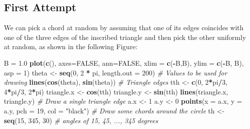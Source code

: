 \documentclass[
]{article}
\newenvironment{Shaded}{\begin{snugshade}}{\end{snugshade}}
\newcommand{\AttributeTok}[1]{\textcolor[rgb]{0.13,0.29,0.53}{#1}}
\newcommand{\CommentTok}[1]{\textcolor[rgb]{0.56,0.35,0.01}{\textit{#1}}}
\newcommand{\ConstantTok}[1]{\textcolor[rgb]{0.56,0.35,0.01}{#1}}
\newcommand{\DecValTok}[1]{\textcolor[rgb]{0.00,0.00,0.81}{#1}}
\newcommand{\FloatTok}[1]{\textcolor[rgb]{0.00,0.00,0.81}{#1}}
\newcommand{\FunctionTok}[1]{\textcolor[rgb]{0.13,0.29,0.53}{\textbf{#1}}}
\newcommand{\NormalTok}[1]{#1}
\newcommand{\OtherTok}[1]{\textcolor[rgb]{0.56,0.35,0.01}{#1}}
\newcommand{\SpecialCharTok}[1]{\textcolor[rgb]{0.81,0.36,0.00}{\textbf{#1}}}
\newcommand{\StringTok}[1]{\textcolor[rgb]{0.31,0.60,0.02}{#1}}
\begin{document}
\subsection{First Attempt}\label{first-attempt}

We can pick a chord at random by assuming that one of its edges
coincides with one of the three edges of the inscribed triangle and then
pick the other uniformly at random, as shown in the following Figure:

\begin{Shaded}
\begin{Highlighting}[]
\NormalTok{B }\OtherTok{=} \FloatTok{1.0}
\FunctionTok{plot}\NormalTok{(}\FunctionTok{c}\NormalTok{(), }\AttributeTok{axes=}\ConstantTok{FALSE}\NormalTok{, }\AttributeTok{ann=}\ConstantTok{FALSE}\NormalTok{, }\AttributeTok{xlim =} \FunctionTok{c}\NormalTok{(}\SpecialCharTok{{-}}\NormalTok{B,B), }\AttributeTok{ylim  =} \FunctionTok{c}\NormalTok{(}\SpecialCharTok{{-}}\NormalTok{B, B), }\AttributeTok{asp =} \DecValTok{1}\NormalTok{)}
\NormalTok{theta }\OtherTok{\textless{}{-}} \FunctionTok{seq}\NormalTok{(}\DecValTok{0}\NormalTok{, }\DecValTok{2} \SpecialCharTok{*}\NormalTok{ pi, }\AttributeTok{length.out =} \DecValTok{200}\NormalTok{) }\CommentTok{\# Values to be used for drawing}
\FunctionTok{lines}\NormalTok{(}\FunctionTok{cos}\NormalTok{(theta), }\FunctionTok{sin}\NormalTok{(theta))}
\CommentTok{\# Triangle edges}
\NormalTok{tth }\OtherTok{\textless{}{-}} \FunctionTok{c}\NormalTok{(}\DecValTok{0}\NormalTok{, }\DecValTok{2}\SpecialCharTok{*}\NormalTok{pi}\SpecialCharTok{/}\DecValTok{3}\NormalTok{, }\DecValTok{4}\SpecialCharTok{*}\NormalTok{pi}\SpecialCharTok{/}\DecValTok{3}\NormalTok{, }\DecValTok{2}\SpecialCharTok{*}\NormalTok{pi)}
\NormalTok{triangle.x }\OtherTok{\textless{}{-}} \FunctionTok{cos}\NormalTok{(tth)}
\NormalTok{triangle.y }\OtherTok{\textless{}{-}} \FunctionTok{sin}\NormalTok{(tth)}
\FunctionTok{lines}\NormalTok{(triangle.x, triangle.y)}
\CommentTok{\# Draw a single triangle edge}
\NormalTok{a.x }\OtherTok{\textless{}{-}} \DecValTok{1}
\NormalTok{a.y }\OtherTok{\textless{}{-}} \DecValTok{0}
\FunctionTok{points}\NormalTok{(}\AttributeTok{x =}\NormalTok{ a.x, }\AttributeTok{y =}\NormalTok{ a.y, }\AttributeTok{pch =} \DecValTok{19}\NormalTok{, }\AttributeTok{col =} \StringTok{"black"}\NormalTok{)}
\CommentTok{\# Draw some chords around the circle}
\NormalTok{th }\OtherTok{\textless{}{-}} \FunctionTok{seq}\NormalTok{(}\DecValTok{15}\NormalTok{, }\DecValTok{345}\NormalTok{, }\DecValTok{30}\NormalTok{) }\CommentTok{\# angles of 15, 45, ..., 345 degrees}

\end{Highlighting}
\end{Shaded}
\end{document}
